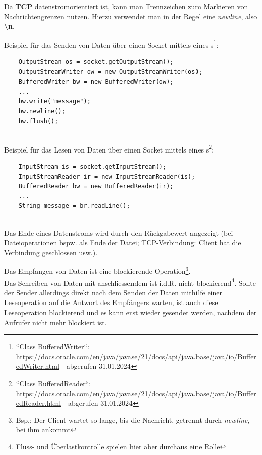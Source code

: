 \noindent
Da \textbf{TCP} datenstromorientiert ist, kann man Trennzeichen zum Markieren von Nachrichtengrenzen nutzen.
Hierzu verwendet man in der Regel eine \textit{newline}, also \textbf{\textbackslash n}.

Beispiel für das Senden von Daten über einen Socket mittels eines s\footnote{
    ``Class BufferedWriter``: \url{https://docs.oracle.com/en/java/javase/21/docs/api/java.base/java/io/BufferedWriter.html} - abgerufen 31.01.2024
}:
\begin{verbatim}
    OutputStrean os = socket.getOutputStream();
    OutputStreamWriter ow = new OutputStreamWriter(os);
    BufferedWriter bw = new BufferedWriter(ow);
    ...
    bw.write("message");
    bw.newline();
    bw.flush();
\end{verbatim}\\

Beispiel für das Lesen von Daten über einen Socket mittels eines s\footnote{
    ``Class BufferedReader``: \url{https://docs.oracle.com/en/java/javase/21/docs/api/java.base/java/io/BufferedReader.html} - abgerufen 31.01.2024
}:
\begin{verbatim}
    InputStream is = socket.getInputStream();
    InputStreamReader ir = new InputStreamReader(is);
    BufferedReader bw = new BufferedReader(ir);
    ...
    String message = br.readLine();
\end{verbatim}\\

\noindent
Das Ende eines Datenstroms wird durch den Rückgabewert  angezeigt (bei Dateioperationen {bspw.} als Ende der Datei; TCP-Verbindung: Client hat die Verbindung geschlossen usw.).

\begin{tcolorbox}[enlarge top by=0.5cm,enlarge bottom by=0.5cm]
    Das Empfangen von Daten ist eine blockierende Operation\footnote{Bsp.: Der Client wartet so lange, bis die Nachricht, getrennt durch \textit{newline}, bei ihm ankommt}.\\
    Das Schreiben von Daten mit anschliessendem  ist i.d.R. nicht blockierend\footnote{
    Fluss- und Überlastkontrolle spielen hier aber durchaus eine Rolle
    }.
    Sollte der Sender allerdings direkt nach dem Senden der Daten mithilfe einer Leseoperation auf die Antwort des Empfängers warten, ist auch diese Leseoperation blockierend und es kann erst wieder gesendet werden, nachdem der Aufrufer nicht mehr blockiert ist.
\end{tcolorbox}

